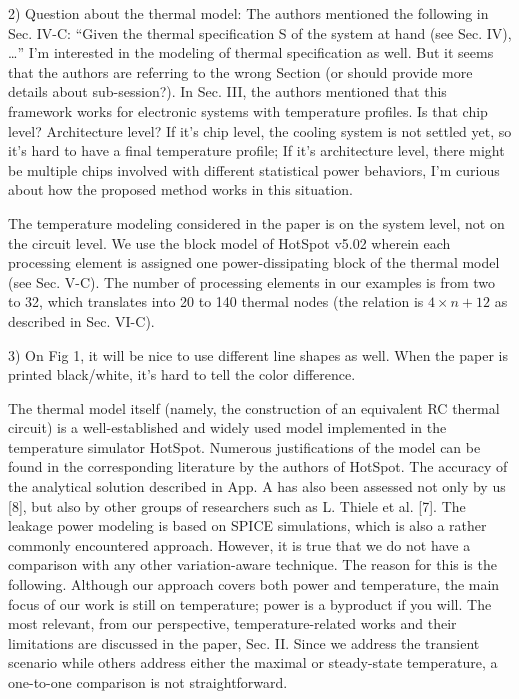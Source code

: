\begin{reviewer}
2) Question about the thermal model: The authors mentioned the following in Sec. IV-C: “Given the thermal specification S of the system at hand (see Sec. IV), …” I’m interested in the modeling of thermal specification as well. But it seems that the authors are referring to the wrong Section (or should provide more details about sub-session?). In Sec. III, the authors mentioned that this framework works for electronic systems with temperature profiles. Is that chip level? Architecture level? If it’s chip level, the cooling system is not settled yet, so it’s hard to have a final temperature profile; If it’s architecture level, there might be multiple chips involved with different statistical power behaviors, I’m curious about how the proposed method works in this situation.
\end{reviewer}
\begin{authors}
The temperature modeling considered in the paper is on the system level, not on the circuit level.
We use the block model of HotSpot v5.02 wherein each processing element is assigned one power-dissipating block of the thermal model (see Sec. V-C).
The number of processing elements in our examples is from two to 32, which translates into 20 to 140 thermal nodes (the relation is $4 \times n + 12$ as described in Sec. VI-C).
\end{authors}

\begin{reviewer}
3) On Fig 1, it will be nice to use different line shapes as well. When the paper is printed black/white, it’s hard to tell the color difference.
\end{reviewer}
\begin{authors}
The thermal model itself (namely, the construction of an equivalent RC thermal circuit) is a well-established and widely used model implemented in the temperature simulator HotSpot.
Numerous justifications of the model can be found in the corresponding literature by the authors of HotSpot.
The accuracy of the analytical solution described in App. A has also been assessed not only by us [8], but also by other groups of researchers such as L. Thiele et al. [7].
The leakage power modeling is based on SPICE simulations, which is also a rather commonly encountered approach.
However, it is true that we do not have a comparison with any other variation-aware technique.
The reason for this is the following.
Although our approach covers both power and temperature, the main focus of our work is still on temperature; power is a byproduct if you will.
The most relevant, from our perspective, temperature-related works and their limitations are discussed in the paper, Sec. II.
Since we address the transient scenario while others address either the maximal or steady-state temperature, a one-to-one comparison is not straightforward.
\end{authors}
